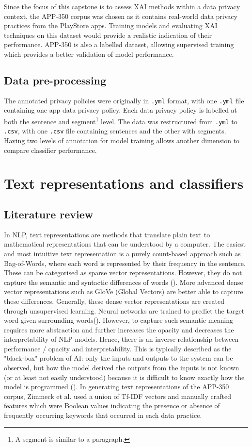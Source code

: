 Since the focus of this capstone is to assess XAI methods within a data privacy context, the APP-350 corpus was chosen as it contains real-world data privacy practices from the PlayStore apps. Training models and evaluating XAI techniques on this dataset would provide a realistic indication of their performance. APP-350 is also a labelled dataset, allowing supervised training which provides a better validation of model performance. 

\subsection{Data pre-processing}
The annotated privacy policies were originally in \texttt{.yml} format, with one \texttt{.yml} file containing one app data privacy policy. Each data privacy policy is labelled at both the sentence and segment\footnote{A segment is similar to a paragraph.} level. The data was restructured from \texttt{.yml} to \texttt{.csv}, with one \texttt{.csv} file containing sentences and the other with segments. Having two levels of annotation for model training allows another dimension to compare classifier performance.

\section{Text representations and classifiers}
\subsection{Literature review}
In NLP, text representations are methods that translate plain text to mathematical representations that can be understood by a computer. The easiest and most intuitive text representation is a purely count-based approach such as Bag-of-Words, where each word is represented by their frequency in the sentence. These can be categorised as sparse vector representations. However, they do not capture the semantic and syntactic differences of words (\cite{liu2020word}). More advanced dense vector representations such as GloVe (Global Vectors) are better able to capture these differences. Generally, these dense vector representations are created through unsupervised learning. Neural networks are trained to predict the target word given surrounding words(\cite{liu2020word}). However, to capture such semantic meaning requires more abstraction and further increases the opacity and decreases the interpretability of NLP models. Hence, there is an inverse relationship between performance / opacity and interpretability.  This is typically described as the "black-box" problem of AI: only the inputs and outputs to the system can be observed, but how the model derived the outputs from the inputs is not known (or at least not easily understood) because it is difficult to know exactly how the model is programmed (\cite{zednik2021}). In generating text representations of the APP-350 corpus, Zimmeck et al. used a union of Tf-IDF vectors and manually crafted features which were Boolean values indicating the presence or absence of frequently occurring keywords that occurred in each data practice.

